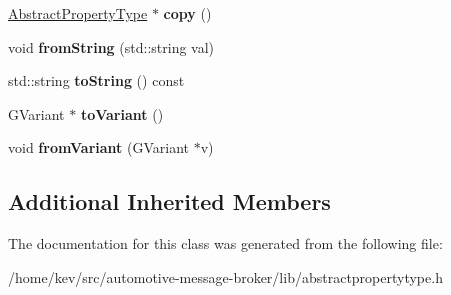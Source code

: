 \begin{DoxyCompactItemize}
\item 
\hypertarget{classBasicPropertyType_a244d19253bfc42dfadd84570b8c8e404}{\hyperlink{classAbstractPropertyType}{Abstract\-Property\-Type} $\ast$ {\bfseries copy} ()}\label{classBasicPropertyType_a244d19253bfc42dfadd84570b8c8e404}

\item 
\hypertarget{classBasicPropertyType_a3c73a6a2c2c020ec327849f318ae9f2a}{void {\bfseries from\-String} (std\-::string val)}\label{classBasicPropertyType_a3c73a6a2c2c020ec327849f318ae9f2a}

\item 
\hypertarget{classBasicPropertyType_a672e2824bcc38da6e60090022fd8d114}{std\-::string {\bfseries to\-String} () const }\label{classBasicPropertyType_a672e2824bcc38da6e60090022fd8d114}

\item 
\hypertarget{classBasicPropertyType_a893a2d1f8fec7141159d850caa78bc06}{G\-Variant $\ast$ {\bfseries to\-Variant} ()}\label{classBasicPropertyType_a893a2d1f8fec7141159d850caa78bc06}

\item 
\hypertarget{classBasicPropertyType_a0e1213ee2df11ecd556b250fe3bad21b}{void {\bfseries from\-Variant} (G\-Variant $\ast$v)}\label{classBasicPropertyType_a0e1213ee2df11ecd556b250fe3bad21b}

\end{DoxyCompactItemize}
\subsection*{Additional Inherited Members}


The documentation for this class was generated from the following file\-:\begin{DoxyCompactItemize}
\item 
/home/kev/src/automotive-\/message-\/broker/lib/abstractpropertytype.\-h\end{DoxyCompactItemize}

